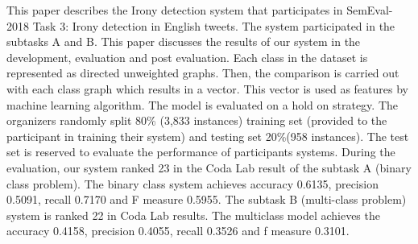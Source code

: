 This paper describes the Irony detection system that participates in SemEval-2018 Task 3: Irony detection in English tweets. The system participated in the subtasks A and B. This paper discusses the results of our system in the development, evaluation and post evaluation. Each class in the dataset is represented as directed unweighted graphs. Then, the comparison is carried out with each class graph which results in a vector. This vector is used as features by machine learning algorithm. The model is evaluated on a hold on strategy. The organizers randomly split 80\% (3,833 instances) training set (provided to the participant in training their system) and testing set 20\%(958 instances). The test set is reserved to evaluate the performance of participants systems. During the evaluation, our system ranked 23 in the Coda Lab result of the subtask A (binary class problem). The binary class system achieves accuracy 0.6135, precision 0.5091, recall 0.7170 and F measure 0.5955. The subtask B (multi-class problem) system is ranked 22 in Coda Lab results. The multiclass model achieves the accuracy 0.4158, precision 0.4055, recall 0.3526 and f measure 0.3101.
